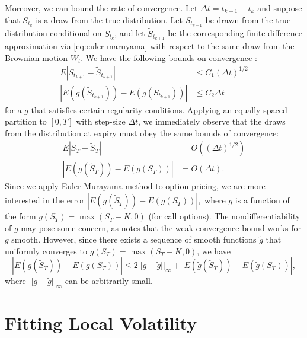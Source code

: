 \documentclass[12pt]{article}
\numberwithin{equation}{section}
\newcommand{\diff}[2]{\frac{\partial #1}{\partial #2}}
\newcommand{\abs}[1]{\left|#1\right|}
\newcommand{\norm}[1]{||#1||}
\newcommand{\pr}[1]{\left(#1\right)}
\begin{document}
Moreover, we can bound the rate of convergence. Let $\Delta t = t_{k+1} - t_k$ and suppose that $S_{t_k}$ is a draw from the true distribution. Let $S_{t_{k+1}}$ be drawn from the true distribution conditional on $S_{t_k}$, and let $\tilde S_{t_{k+1}}$ be the corresponding finite difference approximation via \eqref{eq:euler-maruyama} with respect to the same draw from the Brownian motion $W_t$. We have the following bounds on convergence \citep{higham2001algorithmic}: \begin{align}
E\abs{S_{t_{k+1}} - \tilde S_{t_{k+1}}} &\le C_1(\Delta t)^{1/2} \tag{Strong convergence} \\
\abs{E(g(\tilde S_{t_{k+1}})) - E (g(S_{t_{k+1}}))} &\le C_2 \Delta t \tag{Weak convergence}
\end{align}
for a $g$ that satisfies certain regularity conditions. 
Applying an equally-spaced partition to $[0,T]$ with step-size $\Delta t$, we immediately observe that the draws from the distribution at expiry must obey the same bounds of convergence: \begin{align*}
E\abs{S_{T} - \tilde S_{T}} &= O\pr{(\Delta t)^{1/2}} \\
\abs{E(g(\tilde S_{{T}})) - E (g(S_{T}))} &= O(\Delta t).
\end{align*}
Since we apply Euler-Murayama method to option pricing, we are more interested in the error $\abs{E(g(\tilde S_T)) - E(g(S_T))},$ where $g$ is a function of the form $g(S_T) = \max(S_T - K, 0)$ (for call options). The nondifferentiability of $g$ may pose some concern, as \cite{higham2001algorithmic} notes that the weak convergence bound works for $g$ smooth. However, since there exists a sequence of smooth functions $\tilde g$ that uniformly converges to $g(S_T) = \max(S_T - K, 0)$, we have \[
\abs{E(g(\tilde S_T)) - E(g(S_T))} \le 2\norm{g-\tilde g}_\infty + \abs{E(\tilde g(\tilde S_{{T}})) - E (\tilde g(S_{T}))},
\]
where $\norm{g-\tilde g}_\infty$ can be arbitrarily small. 


\section{Fitting Local Volatility}
\label{sec:localvolfitting}



\end{document}
